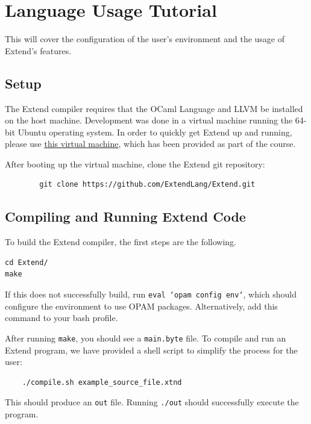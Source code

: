 \chapter{Language Usage Tutorial}

This will cover the configuration of the user's environment and the usage of Extend's features.

\section{Setup}
The Extend compiler requires that the OCaml Language and LLVM be installed on the host machine. Development was done in a virtual machine running the 64-bit Ubuntu operating system. In order to quickly get Extend up and running, please use \underline{\href{https://courseworks2.columbia.edu/courses/10787/files/673708/download}{this virtual machine}}, which has been provided as part of the course.

	\medskip \noindent After booting up the virtual machine, clone the Extend git repository:

	\begin{lstlisting}
		git clone https://github.com/ExtendLang/Extend.git
	\end{lstlisting}

\section{Compiling and Running Extend Code}
To build the Extend compiler, the first steps are the following.

	\begin{lstlisting}
cd Extend/
make
	\end{lstlisting}

	\medskip \noindent
	If this does not successfully build, run \texttt{eval `opam config env`}, which should configure the environment to use OPAM packages. Alternatively, add this command to your bash profile.

	 \medskip \noindent
	 After running \texttt{make}, you should see a \texttt{main.byte} file. To compile and run an Extend program, we have provided a shell script to simplify the process for the user:

	\begin{lstlisting}
	./compile.sh example_source_file.xtnd
	\end{lstlisting}

	\medskip \noindent
	This should produce an \texttt{out} file. Running \texttt{./out} should successfully execute the program.
